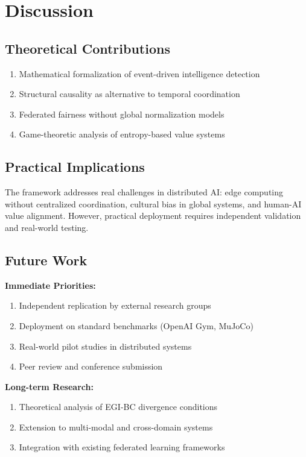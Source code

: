 \documentclass[11pt]{article}
\begin{document}
\section{Discussion}

\subsection{Theoretical Contributions}
\begin{enumerate}
    \item Mathematical formalization of event-driven intelligence detection
    \item Structural causality as alternative to temporal coordination
    \item Federated fairness without global normalization models
    \item Game-theoretic analysis of entropy-based value systems
\end{enumerate}

\subsection{Practical Implications}

The framework addresses real challenges in distributed AI: edge computing without centralized coordination, cultural bias in global systems, and human-AI value alignment. However, practical deployment requires independent validation and real-world testing.

\subsection{Future Work}

\textbf{Immediate Priorities:}
\begin{enumerate}
    \item Independent replication by external research groups
    \item Deployment on standard benchmarks (OpenAI Gym, MuJoCo)
    \item Real-world pilot studies in distributed systems
    \item Peer review and conference submission
\end{enumerate}

\textbf{Long-term Research:}
\begin{enumerate}
    \item Theoretical analysis of EGI-BC divergence conditions
    \item Extension to multi-modal and cross-domain systems
    \item Integration with existing federated learning frameworks
\end{enumerate}
\end{document}
